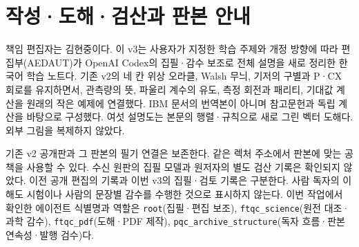 \section*{작성·도해·검산과 판본 안내}

책임 편집자는 김현중이다. 이 v3는 사용자가 지정한 학습 주제와 개정 방향에 따라
편집부(AEDAUT)가 OpenAI Codex의 집필·감수 보조로 전체 설명을 새로 정리한 한국어 학습 노트다.
기존 v2의 네 칸 위상 오라클, Walsh 무늬, 기저의 구별과 P·CX 회로를 유지하면서,
관측량의 뜻, 파울리 계수의 유도, 측정 회전과 패리티, 기대값 계산을 원래의 작은 예제에 연결했다.
IBM 문서의 번역본이 아니며 참고문헌과 독립 계산을 바탕으로 구성했다.
여섯 설명도는 본문의 행렬·규칙으로 새로 그린 벡터 도해다. 외부 그림을 복제하지 않았다.

기존 v2 공개판과 그 판본의 필기 연결은 보존한다. 같은 렉처 주소에서 판본에 맞는 공책을 사용할 수 있다.
수신 원판의 집필 모델과 원저자의 별도 검산 기록은 확인되지 않았다.
이전 공개 편집의 기록과 이번 v3의 집필·검토 기록은 구분한다.
사람 독자의 이해도 시험이나 사람의 문장별 감수를 수행한 것으로 표시하지 않는다.
이번 작업에서 확인한 에이전트 식별명과 역할은 \texttt{root}(집필·편집 보조),
\texttt{ftqc\_science}(원전 대조·과학 감수), \texttt{ftqc\_pdf}(도해·PDF 제작),
\texttt{pqc\_archive\_structure}(독자 흐름·판본 연속성·발행 검수)다.



\AIModelDisclosure

